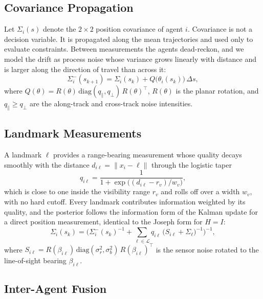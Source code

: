 \documentclass[letterpaper, 10 pt, conference]{ieeeconf}
\theoremstyle{remark}
\begin{document}
\subsection{Covariance Propagation}

Let $\Sigma_i(s)$ denote the $2\times2$ position covariance of agent $i$.
Covariance is not a decision variable. It is propagated along the mean
trajectories and used only to evaluate constraints. Between measurements the
agents dead-reckon, and we model the drift as process noise whose variance
grows linearly with distance and is larger along the direction of travel than
across it:
\begin{equation}
  \Sigma_i^{-}(s_{k+1}) = \Sigma_i(s_k) + Q\big(\theta_i(s_k)\big)\,\Delta s,
  \label{eq:prop}
\end{equation}
where $Q(\theta) = R(\theta)\,\mathrm{diag}(q_\parallel, q_\perp)\,R(\theta)^{\!\top}$,
$R(\theta)$ is the planar rotation, and $q_\parallel \ge q_\perp$ are the
along-track and cross-track noise intensities.

\subsection{Landmark Measurements}

A landmark $\ell$ provides a range-bearing measurement whose quality decays
smoothly with the distance $d_{i\ell} = \lVert x_i - \ell \rVert$ through the
logistic taper
\begin{equation}
  q_{i\ell} = \frac{1}{1 + \exp\!\big((d_{i\ell} - r_v)/w_v\big)},
  \label{eq:taper}
\end{equation}
which is close to one inside the visibility range $r_v$ and rolls off over a
width $w_v$, with no hard cutoff. Every landmark contributes information
weighted by its quality, and the posterior follows the information form of
the Kalman update for a direct position measurement, identical to the Joseph
form for $H = I$:
\begin{equation}
  \Sigma_i(s_k) = \Big( \Sigma_i^{-}(s_k)^{-1}
  + \sum_{\ell \in \mathcal{L}} q_{i\ell}\,\big(S_{i\ell} + \Sigma_\ell\big)^{-1} \Big)^{-1},
  \label{eq:lm}
\end{equation}
where $S_{i\ell} = R(\beta_{i\ell})\,\mathrm{diag}(\sigma_r^2, \sigma_b^2)\,R(\beta_{i\ell})^{\!\top}$
is the sensor noise rotated to the line-of-sight bearing $\beta_{i\ell}$.

\subsection{Inter-Agent Fusion}
\end{document}
